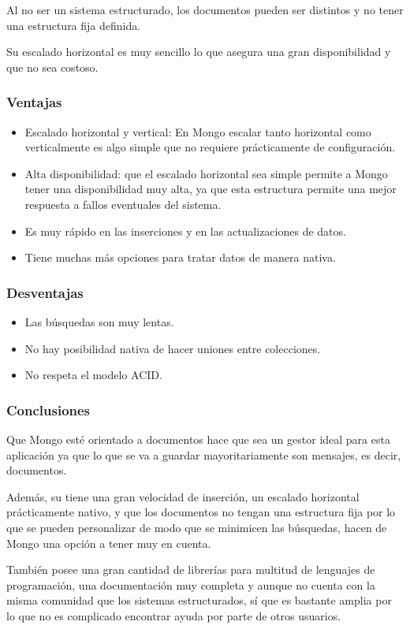 Al no ser un sistema estructurado, los documentos pueden ser distintos y no tener una estructura fija definida. 

Su escalado horizontal es muy sencillo lo que asegura una gran disponibilidad y que no sea costoso. 
\subsubsection{Ventajas}
\begin{itemize}
    \item Escalado horizontal y vertical: En Mongo escalar tanto horizontal como verticalmente es algo simple que no requiere prácticamente de configuración. 
    \item Alta disponibilidad: que el escalado horizontal sea simple permite a Mongo tener una disponibilidad muy alta, ya que esta estructura permite una mejor respuesta a fallos eventuales del sistema. 
    \item Es muy rápido en las inserciones y en las actualizaciones de datos. 
    \item Tiene muchas más opciones para tratar datos de manera nativa. 
\end{itemize}

\subsubsection{Desventajas}
\begin{itemize}
    \item Las búsquedas son muy lentas.
    \item No hay posibilidad nativa de hacer uniones entre colecciones. 
    \item No respeta el modelo ACID.
\end{itemize}

\subsubsection{Conclusiones}
Que Mongo esté orientado a documentos hace que sea un gestor ideal para esta aplicación ya que lo que se va a guardar mayoritariamente son mensajes, es decir, documentos. 

Además, su tiene una gran velocidad de inserción, un escalado horizontal prácticamente nativo, y que los documentos no tengan una estructura fija por lo que se pueden personalizar de modo que se minimicen las búsquedas, hacen de Mongo una opción a tener muy en cuenta. 

También posee una gran cantidad de librerías para multitud de lenguajes de programación, una documentación muy completa y aunque no cuenta con la misma comunidad que los sistemas estructurados, sí que es bastante amplia por lo que no es complicado encontrar ayuda por parte de otros usuarios. 

